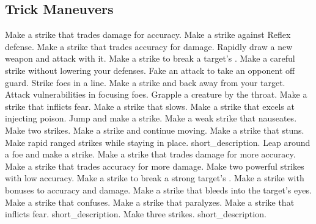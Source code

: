 \subsection{Trick Maneuvers}\label{Trick Maneuvers}
\begin{spelllist}
 Make a strike that trades damage for accuracy.
 Make a strike against Reflex defense.
 Make a strike that trades accuracy for damage.
 Rapidly draw a new weapon and attack with it.
 Make a strike to break a target's .
 Make a careful strike without lowering your defenses.
 Fake an attack to take an opponent off guard.
 Strike foes in a line.
 Make a strike and back away from your target.
 Attack vulnerabilities in focusing foes.
 Grapple a creature by the throat.
 Make a strike that inflicts fear.
 Make a strike that slows.
 Make a strike that excels at injecting poison.
 Jump and make a strike.
 Make a weak strike that nauseates.
 Make two strikes.
 Make a strike and continue moving.
 Make a strike that stuns.
 Make rapid ranged strikes while staying in place.
 short_description.
 Leap around a foe and make a strike.
 Make a strike that trades damage for more accuracy.
 Make a strike that trades accuracy for more damage.
 Make two powerful strikes with low accuracy.
 Make a strike to break a strong target's .
 Make a strike with bonuses to accuracy and damage.
 Make a strike that bleeds into the target's eyes.
 Make a strike that confuses.
 Make a strike that paralyzes.
 Make a strike that inflicts fear.
 short_description.
 Make three strikes.
 short_description.
\end{spelllist}



